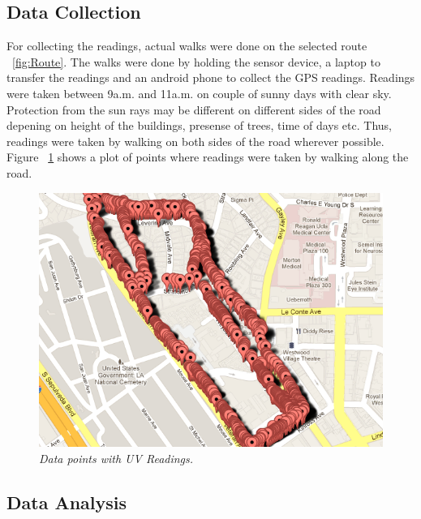\documentclass[12pt,fullpage,doublespace]{article}
\begin{document}
\subsection{Data Collection}
For collecting the readings, actual walks were done on the selected route ~\ref{fig:Route}. The walks were done by holding the sensor device, a laptop to transfer the readings and an android phone to collect the GPS readings. Readings were taken between 9a.m. and 11a.m. on couple of sunny days with clear sky. Protection from the sun rays may be different on different sides of the road depening on height of the buildings, presense of trees, time of days etc. Thus, readings were taken by walking on both sides of the road wherever possible. Figure ~\ref{fig:dataPoints} shows a plot of points where readings were taken by walking along the road.
\begin{figure}
\begin{center}
\includegraphics[scale=0.35]{dataPoints.png}
\caption{\small \sl Data points with UV Readings.\label{fig:dataPoints}}
\end{center}
\end{figure}

\subsection{Data Analysis}
\end{document}
